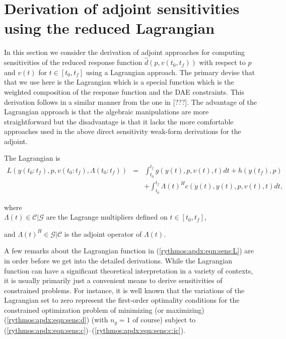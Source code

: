 \documentclass[pdf,ps2pdf,11pt]{SANDreport}
\begin{document}
\section{Derivation of adjoint sensitivities using the reduced Lagrangian}

In this section we consider the derivation of adjoint approaches for computing
sensitivities of the reduced response function $\hat{d}(p,v(t_0,t_f))$ with
respect to $p$ and $v(t)$ for $t\in[t_0,t_f]$ using a Lagrangian approach.  The
primary devise that that we use here is the Lagrangian which is a special
function which is the weighted composition of the response function and the
DAE constraints.  This derivation follows in a similar manner from the one in
[???].  The advantage of the Lagrangian approach is that the algebraic
manipulations are more straightforward but the disadvantage is that it lacks
the more comfortable approaches used in the above direct sensitivity weak-form
derivations for the adjoint.

The Lagrangian is
%
\begin{eqnarray}
L(y(t_0:t_f),p,v(t_0:t_f),\Lambda(t_0:t_f))
& = & \int_{t_0}^{t_f} g(y(t),p,v(t),t) dt + h(y(t_f),p) \nonumber \\
& & + \int_{t_0}^{t_f} \Lambda(t)^H c(\dot{y}(t),y(t),p,v(t),t) dt,
\label{rythmos:apdx:eqn:sens:L}
\end{eqnarray}
\begin{tabbing}
\hspace{4ex}where\hspace{1ex}\= \\
\>	$\Lambda(t) \in \mathcal{C}|\mathcal{G}$ are the Lagrange multipliers defined on $t\in[t_0,t_f]$,
\end{tabbing}
%
and $\Lambda(t)^H\in\mathcal{G}|\mathcal{C}$ is the adjoint operator
of $\Lambda(t)$.

A few remarks about the Lagrangian function in (\ref{rythmos:apdx:eqn:sens:L})
are in order before we get into the detailed derivations.  While the
Lagrangian function can have a significant theoretical interpretation in a
variety of contexts, it is usually primarily just a convenient means to derive
sensitivities of constrained problems.  For instance, it is well known that
the variations of the Lagrangian set to zero represent the first-order
optimality conditions for the constrained optimization problem of minimizing
(or maximizing) (\ref{rythmos:apdx:eqn:sens:d}) (with $n_g=1$ of course)
subject to
(\ref{rythmos:apdx:eqn:sens:c})--(\ref{rythmos:apdx:eqn:sens:c:ic}).
\end{document}
